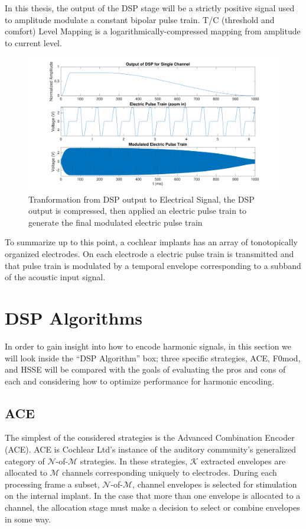 \documentclass [11pt, proquest,oneside] {ganter_thesis}[2015/03/03]
\begin{document}
In this thesis, the output of the DSP stage will be a strictly positive signal used to amplitude modulate a constant bipolar pulse train.  T/C (threshold and comfort) Level Mapping is a logarithmically-compressed mapping from amplitude to current level.

\begin{figure}[!ht]
  \centering
    \includegraphics[width=1.0\textwidth]{matlab/output_of_dsp}   
    \caption{Tranformation from DSP output to Electrical Signal, the DSP output is compressed, then applied an electric pulse train to generate the final modulated electric pulse train}\label{fig:output_of_dsp}
\end{figure}

To summarize up to this point, a cochlear implants has an array of tonotopically organized electrodes.  On each electrode a electric pulse train is transmitted and that pulse train is modulated by a temporal envelope corresponding to a subband of the acoustic input signal.

\section{DSP Algorithms}

In order to gain insight into how to encode harmonic signals, in this section we will look inside the ``DSP Algorithm'' box; three specific strategies, ACE, F0mod, and HSSE will be compared with the goals of evaluating the pros and cons of each and considering how to optimize performance for harmonic encoding.

\subsection{ACE}\label{ss:ACE}

The simplest of the considered strategies is the Advanced Combination Encoder (ACE).  ACE is Cochlear Ltd's instance of the auditory community's generalized category of $\mathcal{N}$-of-$\mathcal{M}$ strategies.  In these strategies, $\mathcal{K}$ extracted envelopes are allocated to $\mathcal{M}$ channels corresponding uniquely to electrodes.  During each processing frame a subset, $\mathcal{N}$-of-$\mathcal{M}$, channel envelopes is selected for stimulation on the internal implant.  In the case that more than one envelope is allocated to a channel, the allocation stage must make a decision to select or combine envelopes in some way.
\end{document}
